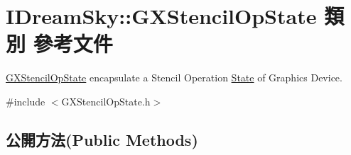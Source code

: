 \hypertarget{class_i_dream_sky_1_1_g_x_stencil_op_state}{}\section{I\+Dream\+Sky\+:\+:G\+X\+Stencil\+Op\+State 類別 參考文件}
\label{class_i_dream_sky_1_1_g_x_stencil_op_state}


\hyperlink{class_i_dream_sky_1_1_g_x_stencil_op_state}{G\+X\+Stencil\+Op\+State} encapsulate a Stencil Operation \hyperlink{class_i_dream_sky_1_1_state}{State} of Graphics Device.  




{\ttfamily \#include $<$G\+X\+Stencil\+Op\+State.\+h$>$}

\subsection*{公開方法(Public Methods)}
